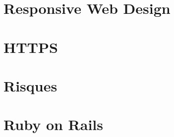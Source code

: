\documentclass[a4paper,12pt]{scrbook}
\begin{document}
\chapter{ Responsive Web Design}


\chapter{ HTTPS}


\chapter{ Risques}


\chapter{ Ruby on Rails}

\end{document}
